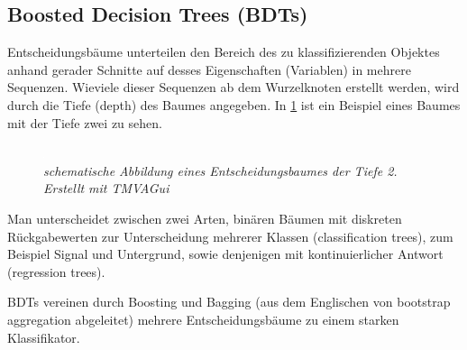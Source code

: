 \subsection{Boosted Decision Trees (BDTs)}
\label{ch:Algorithmen:subsec:BDT}

Entscheidungsb\"aume unterteilen den Bereich des zu klassifizierenden Objektes anhand gerader Schnitte auf desses Eigenschaften (Variablen) in mehrere Sequenzen. Wieviele dieser Sequenzen ab dem Wurzelknoten erstellt werden, wird durch die Tiefe (depth) des Baumes angegeben. In \ref{fig:DecicionTree} ist ein Beispiel eines Baumes mit der Tiefe zwei zu sehen.\\
\begin{figure}[hhh]
 \begin{center}
   \includegraphics[width=.7\textwidth]{graphics/tree.pdf}
   \parbox[b]{12cm}{
     \caption[Entscheidungsbaumes der Tiefe 2]
             {\label{fig:DecicionTree} \it schematische Abbildung eines Entscheidungsbaumes der Tiefe 2. Erstellt mit TMVAGui}
   }
 \end{center}
\end{figure}
Man unterscheidet zwischen zwei Arten, bin\"aren B\"aumen mit diskreten R\"uckgabewerten zur Unterscheidung mehrerer Klassen (classification trees), zum Beispiel Signal und Untergrund, sowie denjenigen mit kontinuierlicher Antwort (regression trees).\cite{SWB-455193959}

BDTs vereinen durch Boosting und Bagging (aus dem Englischen von bootstrap aggregation abgeleitet) mehrere Entscheidungsb\"aume zu einem starken Klassifikator.